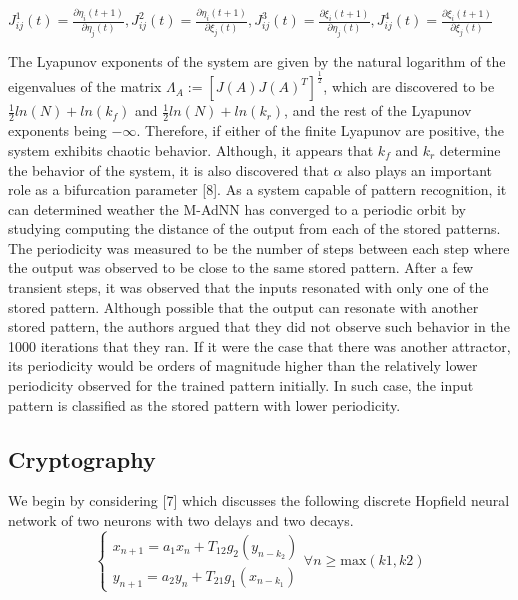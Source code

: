 \documentclass[12pt, letterpaper]{article}
\begin{document}
$J_{ij}^1(t) = \frac{\partial \eta_i(t+1)}{\partial \eta_j(t)}, J_{ij}^2(t) = \frac{\partial \eta_i(t+1)}{\partial \xi_j(t)}, J_{ij}^3(t) = \frac{\partial \xi_i(t+1)}{\partial \eta_j(t)}, J_{ij}^4(t) = \frac{\partial \xi_i(t+1)}{\partial \xi_j(t)}$

The Lyapunov exponents of the system are given by the natural logarithm of the eigenvalues of the matrix $\Lambda_A := [J(A)J(A)^T]^{\frac{1}{2}}$, which are discovered to be ${\frac{1}{2}}ln(N) + ln(k_f)$ and ${\frac{1}{2}}ln(N) + ln(k_r)$, and the rest of the Lyapunov exponents being $-\infty$. Therefore, if either of the finite Lyapunov are positive, the system exhibits chaotic behavior. Although, it appears that $k_f$ and $k_r$ determine the behavior of the system, it is also discovered that $\alpha$ also plays an important role as a bifurcation parameter [8]. As a system capable of pattern recognition, it can determined weather the M-AdNN has converged to a periodic orbit by studying computing the distance of the output from each of the stored patterns. The periodicity was measured to be the number of steps between each step where the output was observed to be close to the same stored pattern. After a few transient steps, it was observed that the inputs resonated with only one of the stored pattern. Although possible that the output can resonate with another stored pattern, the authors argued that they did not observe such behavior in the 1000 iterations that they ran. If it were the case that there was another attractor, its periodicity would be orders of magnitude higher than the relatively lower periodicity observed for the trained pattern initially. In such case, the input pattern is classified as the stored pattern with lower periodicity.


\subsection*{Cryptography}
We begin by considering [7] which discusses the following discrete Hopfield neural network of two neurons with two delays and two decays.
\begin{equation}\label{hopfield network}
    \begin{cases}
    x_{n+1} = a_{1}x_{n} + T_{12}g_{2}(y_{n - k_{2}})\\
    y_{n+1} = a_{2}y_{n} + T_{21}g_{1}(x_{n - k_{1}})
    \end{cases} \forall n \geq \text{max}(k1, k2)
\end{equation}
\end{document}
